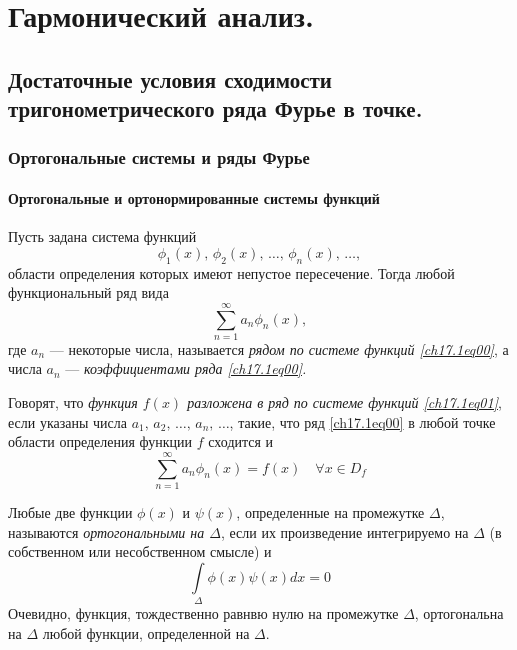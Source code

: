 \part[Гармонический анализ.]{Гармонический анализ.}%

\chapter{Достаточные условия сходимости тригонометрического ряда Фурье в точке.}
\section{Ортогональные системы и ряды Фурье}
\subsection{Ортогональные и ортонормированные системы функций}
Пусть задана система функций 
\begin{equation} \label{ch17.1eq00}
\phi_1(x), \,\phi_2(x), \, \ldots, \, \phi_n(x), \, \ldots,
\end{equation}
области определения которых имеют непустое пересечение. Тогда любой функциональный ряд вида
\begin{equation} \label{ch17.1eq01}
 \sum_{n = 1}^{\infty} a_n \phi_n(x),
 \end{equation}
 где $a_n$ --- некоторые числа, называется \textit{рядом по системе функций \eqref{ch17.1eq00}}, а числа $a_n$ --- \textit{коэффициентами ряда \eqref{ch17.1eq00}.}
 
 Говорят, что \textit{функция $f(x)$ разложена в ряд по системе функций \eqref{ch17.1eq01}}, если указаны числа $a_1, \,a_2, \,\ldots, \, a_n, \,\ldots$, такие, что ряд \eqref{ch17.1eq00} в любой точке области определения функции $f$ сходится и 
 $$
  \sum_{n = 1}^{\infty} a_n \phi_n(x)=f(x) \quad \forall x \in D_f
  $$ 



\begin{defn}
Любые две функции $\phi(x)$	и $\psi(x)$, определенные на промежутке $\Delta$, называются \textit{ортогональными на $\Delta$}, если их произведение интегрируемо на $\Delta$ (в собственном или несобственном смысле) и
$$
\int \limits_\Delta\phi(x) \psi(x)dx=0
$$
Очевидно, функция, тождественно равнвю нулю на промежутке $\Delta$, ортогональна на $\Delta$ любой функции, определенной на $\Delta$.
\end{defn}


